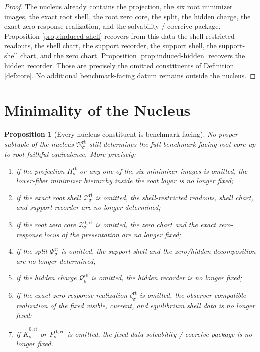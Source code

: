 \documentclass[11pt]{article}
\newcommand{\RootProj}[1]{\Pi_{#1}^{\mathrm{rt}}}
\newcommand{\RootShellSet}[1]{\mathcal Z_{#1}^{\mathrm{rt}}}
\newcommand{\RootZeroCore}[1]{\mathcal Z_{#1}^{0,\mathrm{rt}}}
\newcommand{\RootSplit}[1]{\Phi_{#1}^{\mathrm{rt}}}
\newcommand{\RootCharge}[1]{\mathcal Q_{#1}^{\mathrm{rt}}}
\newcommand{\RootEmbed}[1]{\zeta_{#1}^{\mathrm{rt}}}
\newcommand{\RootKernelCh}[1]{\widetilde K_{#1}^{0,\mathrm{rt}}}
\newcommand{\RootStateComp}[1]{P_{#1}^{\mathrm{rt,co}}}
\newcommand{\RootNucleus}[1]{\mathfrak N_{#1}^{\mathrm{rt}}}
\newtheorem{proposition}{Proposition}
\begin{document}
\begin{proof}
The nucleus already contains the projection, the six root minimizer images, the exact root shell, the root zero core, the split, the hidden charge, the exact zero-response realization, and the solvability / coercive package. Proposition \ref{prop:induced-shell} recovers from this data the shell-restricted readouts, the shell chart, the support recorder, the support shell, the support-shell chart, and the zero chart. Proposition \ref{prop:induced-hidden} recovers the hidden recorder. Those are precisely the omitted constituents of Definition \ref{def:core}. No additional benchmark-facing datum remains outside the nucleus.
\end{proof}

\section{Minimality of the Nucleus}

\begin{proposition}[Every nucleus constituent is benchmark-facing]
\label{prop:necessary}
No proper subtuple of the nucleus \(\RootNucleus{\sigma}\) still determines the full benchmark-facing root core up to root-faithful equivalence. More precisely:
\begin{enumerate}
    \item if the projection \(\RootProj{\sigma}\) or any one of the six minimizer images is omitted, the lower-fiber minimizer hierarchy inside the root layer is no longer fixed;
    \item if the exact root shell \(\RootShellSet{\sigma}\) is omitted, the shell-restricted readouts, shell chart, and support recorder are no longer determined;
    \item if the root zero core \(\RootZeroCore{\sigma}\) is omitted, the zero chart and the exact zero-response locus of the presentation are no longer fixed;
    \item if the split \(\RootSplit{\sigma}\) is omitted, the support shell and the zero/hidden decomposition are no longer determined;
    \item if the hidden charge \(\RootCharge{\sigma}\) is omitted, the hidden recorder is no longer fixed;
    \item if the exact zero-response realization \(\RootEmbed{\sigma}\) is omitted, the observer-compatible realization of the fixed visible, current, and equilibrium shell data is no longer fixed;
    \item if \(\RootKernelCh{\sigma}\) or \(\RootStateComp{\sigma}\) is omitted, the fixed-data solvability / coercive package is no longer fixed.
\end{enumerate}
\end{proposition}
\end{document}
